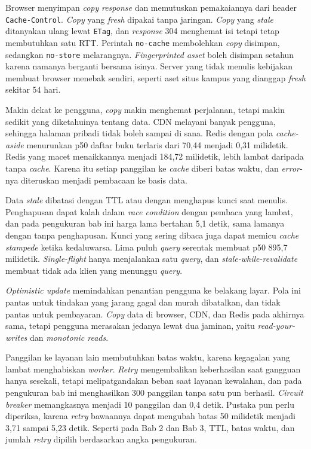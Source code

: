 Browser menyimpan \textit{copy} \textit{response} dan memutuskan pemakaiannya dari header
\texttt{Cache-Control}. \textit{Copy} yang \textit{fresh} dipakai tanpa jaringan. \textit{Copy} yang
\textit{stale} ditanyakan ulang lewat \texttt{ETag}, dan \textit{response} 304 menghemat isi tetapi
tetap membutuhkan satu RTT. Perintah \texttt{no-cache} membolehkan \textit{copy}
disimpan, sedangkan \texttt{no-store} melarangnya. \textit{Fingerprinted asset}
boleh disimpan setahun karena namanya berganti bersama isinya. Server yang
tidak menulis kebijakan membuat browser menebak sendiri, seperti aset situs
kampus yang dianggap \textit{fresh} sekitar 54 hari.

Makin dekat ke pengguna, \textit{copy} makin menghemat perjalanan, tetapi makin
sedikit yang diketahuinya tentang data. CDN melayani banyak pengguna, sehingga
halaman pribadi tidak boleh sampai di sana. Redis dengan pola
\textit{cache-aside} menurunkan p50 daftar buku terlaris dari 70,44 menjadi
0,31 milidetik. Redis yang macet menaikkannya menjadi 184,72 milidetik, lebih
lambat daripada tanpa \textit{cache}. Karena itu setiap panggilan ke
\textit{cache} diberi batas waktu, dan \textit{error}-nya diteruskan menjadi pembacaan ke
basis data.

Data \textit{stale} dibatasi dengan TTL atau dengan menghapus kunci saat menulis.
Penghapusan dapat kalah dalam \textit{race condition} dengan pembaca yang
lambat, dan pada pengukuran bab ini harga lama bertahan 5,1 detik, sama lamanya
dengan tanpa penghapusan. Kunci yang sering dibaca juga dapat memicu
\textit{cache stampede} ketika kedaluwarsa. Lima puluh \textit{query} serentak membuat
p50 895,7 milidetik. \textit{Single-flight} hanya menjalankan satu \textit{query}, dan
\textit{stale-while-revalidate} membuat tidak ada klien yang menunggu \textit{query}.

\textit{Optimistic update} memindahkan penantian pengguna ke belakang layar.
Pola ini pantas untuk tindakan yang jarang gagal dan murah dibatalkan, dan
tidak pantas untuk pembayaran. \textit{Copy} data di browser, CDN, dan Redis pada
akhirnya sama, tetapi pengguna merasakan jedanya lewat dua jaminan, yaitu
\textit{read-your-writes} dan \textit{monotonic reads}.

Panggilan ke layanan lain membutuhkan batas waktu, karena kegagalan yang lambat
menghabiskan \textit{worker}. \textit{Retry} mengembalikan keberhasilan saat gangguan
hanya sesekali, tetapi melipatgandakan beban saat layanan kewalahan, dan pada
pengukuran bab ini menghasilkan 300 panggilan tanpa satu pun berhasil.
\textit{Circuit breaker} memangkasnya menjadi 10 panggilan dan 0,4 detik.
Pustaka pun perlu diperiksa, karena \textit{retry} bawaannya dapat mengubah
batas 50 milidetik menjadi 3,71 sampai 5,23 detik. Seperti pada Bab 2 dan Bab 3,
TTL, batas waktu, dan jumlah \textit{retry} dipilih berdasarkan angka
pengukuran.
